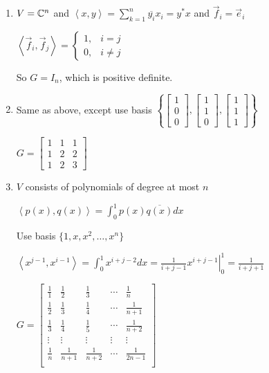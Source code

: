 \documentclass[letterpaper,12pt,fleqn]{article}
\newcommand{\inner}[2]{\left<#1,#2\right>}
\newcommand{\conj}[1]{\overline{#1}}
\newcommand{\ve}{\vec{e}}
\newcommand{\vf}{\vec{f}}
\begin{document}
\begin{example}
  \listbreak
  \begin{enumerate}
  \item $V=\mathbb{C}^n$ and $\inner{x}{y}=\sum_{k=1}^n\conj{y_i}x_i=y^*x$ and
    $\vf_i=\ve_i$

    $\inner{\vf_i}{\vf_j}=\begin{cases}
    1, & i=j \\
    0, & i\ne j
    \end{cases}$

    So $G=I_n$, which is positive definite.

  \item Same as above, except use basis
    $\left\{\begin{bmatrix} 1 \\ 0 \\ 0 \end{bmatrix},
    \begin{bmatrix} 1 \\ 1 \\ 0 \end{bmatrix},
    \begin{bmatrix} 1 \\ 1 \\ 1 \end{bmatrix}\right\}$

    $G=\begin{bmatrix}
    1 & 1 & 1 \\
    1 & 2 & 2 \\
    1 & 2 & 3
    \end{bmatrix}$

  \item $V$ consists of polynomials of degree at most $n$

    $\inner{p(x)}{q(x)}=\int_0^1p(x)\conj{q(x)}dx$

    Use basis $\{1,x,x^2,\ldots,x^n\}$

    $\inner{x^{j-1}}{x^{i-1}}=\int_0^1x^{i+j-2}dx=
    \left.\frac{1}{i+j-1}x^{i+j-1}\right\rvert_0^1=\frac{1}{i+j+1}$

    $G=\begin{bmatrix}
    \frac{1}{1} & \frac{1}{2} & \frac{1}{3} & \cdots & \frac{1}{n} \\
    \frac{1}{2} & \frac{1}{3} & \frac{1}{4} & \cdots & \frac{1}{n+1} \\
    \frac{1}{3} & \frac{1}{4} & \frac{1}{5} & \cdots & \frac{1}{n+2} \\
    \vdots & \vdots & \vdots & \vdots & \vdots \\
    \frac{1}{n} & \frac{1}{n+1} & \frac{1}{n+2} & \cdots & \frac{1}{2n-1} \\
    \end{bmatrix}$
  \end{enumerate}
\end{example}
\end{document}
